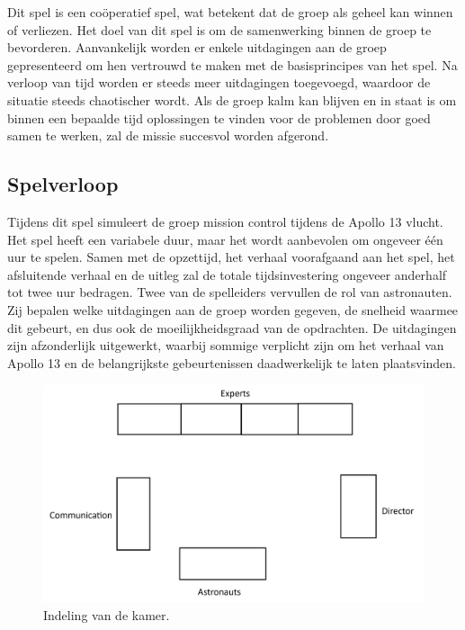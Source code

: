 \documentclass[
	a4paper, %
	10pt, %
	unnumberedsections, %
	twoside, %
]{LTJournalArticle}
\begin{document}
Dit spel is een coöperatief spel, wat betekent dat de groep als geheel kan winnen of verliezen. Het doel van dit spel is om de samenwerking binnen de groep te bevorderen. Aanvankelijk worden er enkele uitdagingen aan de groep gepresenteerd om hen vertrouwd te maken met de basisprincipes van het spel. Na verloop van tijd worden er steeds meer uitdagingen toegevoegd, waardoor de situatie steeds chaotischer wordt. Als de groep kalm kan blijven en in staat is om binnen een bepaalde tijd oplossingen te vinden voor de problemen door goed samen te werken, zal de missie succesvol worden afgerond.

\subsection{Spelverloop}
Tijdens dit spel simuleert de groep mission control tijdens de Apollo 13 vlucht. Het spel heeft een variabele duur, maar het wordt aanbevolen om ongeveer één uur te spelen. Samen met de opzettijd, het verhaal voorafgaand aan het spel, het afsluitende verhaal en de uitleg zal de totale tijdsinvestering ongeveer anderhalf tot twee uur bedragen. Twee van de spelleiders vervullen de rol van astronauten. Zij bepalen welke uitdagingen aan de groep worden gegeven, de snelheid waarmee dit gebeurt, en dus ook de moeilijkheidsgraad van de opdrachten. De uitdagingen zijn afzonderlijk uitgewerkt, waarbij sommige verplicht zijn om het verhaal van Apollo 13 en de belangrijkste gebeurtenissen daadwerkelijk te laten plaatsvinden.

\begin{figure}
	\includegraphics[width=\linewidth]{Figures/Layout.jpg}
	\caption{Indeling van de kamer.}
	\label{fig:timeline}
\end{figure}

\end{document}
